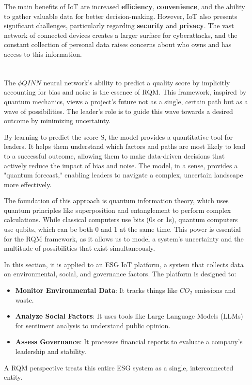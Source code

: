 \documentclass{article}
\begin{document}
The main benefits of IoT are increased \textbf{efficiency}, \textbf{convenience}, and the ability to gather valuable data for better decision-making. However, IoT also presents significant challenges, particularly regarding \textbf{security} and \textbf{privacy}. The vast network of connected devices creates a larger surface for cyberattacks, and the constant collection of personal data raises concerns about who owns and has access to this information.\\\\\\
The $\phi QINN$ neural network's ability to predict a quality score by implicitly accounting for bias and noise is the essence of RQM. This framework, inspired by quantum mechanics, views a project's future not as a single, certain path but as a wave of possibilities. The leader's role is to guide this wave towards a desired outcome by minimizing uncertainty.

By learning to predict the score S, the model provides a quantitative tool for leaders. It helps them understand which factors and paths are most likely to lead to a successful outcome, allowing them to make data-driven decisions that actively reduce the impact of bias and noise. The model, in a sense, provides a "quantum forecast," enabling leaders to navigate a complex, uncertain landscape more effectively.

The foundation of this approach is quantum information theory, which uses quantum principles like superposition and entanglement to perform complex calculations. While classical computers use bits (0s or 1s), quantum computers use qubits, which can be both 0 and 1 at the same time. This power is essential for the RQM framework, as it allows us to model a system's uncertainty and the multitude of possibilities that exist simultaneously.

In this section, it is applied to an ESG IoT platform, a system that collects data on environmental, social, and governance factors. The platform is designed to:
\begin{itemize}
\item \textbf{Monitor Environmental Data}: It tracks things like $CO_2$ emissions and waste.
\item \textbf{Analyze Social Factors}: It uses tools like Large Language Models (LLMs) for sentiment analysis to understand public opinion.
\item \textbf{Assess Governance}: It processes financial reports to evaluate a company's leadership and stability.
\end{itemize}
A RQM perspective treats this entire ESG system as a single, interconnected entity.
\end{document}
